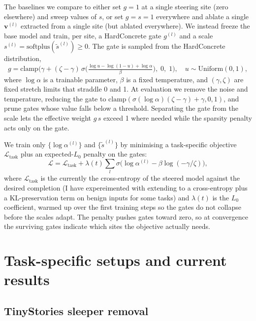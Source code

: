 \documentclass[a4paper,11pt]{article}
\begin{document}
The baselines we compare to either set $g=1$ at a single steering site (zero elsewhere) and sweep values of $s$, or set $g=s=1$ everywhere and ablate a single $\mathbf{v}^{(l)}$ extracted from a single site (but ablated everywhere). We instead freeze the base model and train, per site, a HardConcrete gate $g^{(l)}$ and a scale $s^{(l)} = \mathrm{softplus}(\tilde{s}^{(l)}) \ge 0$. The gate is sampled from the HardConcrete distribution,
\begin{equation}
    g = \mathrm{clamp}\!\Big(\gamma + (\zeta - \gamma)\,\sigma\!\Big(\tfrac{\log u - \log(1-u) + \log\alpha}{\beta}\Big),\; 0,\; 1\Big), \quad u \sim \mathrm{Uniform}(0,1),
\end{equation}
where $\log\alpha$ is a trainable parameter, $\beta$ is a fixed temperature, and $(\gamma, \zeta)$ are fixed stretch limits that straddle 0 and 1. At evaluation we remove the noise and temperature, reducing the gate to $\mathrm{clamp}(\sigma(\log\alpha)(\zeta-\gamma)+\gamma, 0, 1)$, and prune gates whose value falls below a threshold. Separating the gate from the scale lets the effective weight $g \, s$ exceed 1 where needed while the sparsity penalty acts only on the gate.

We train only $\{\log\alpha^{(l)}\}$ and $\{\tilde{s}^{(l)}\}$ by minimising a task-specific objective $\mathcal{L}_\text{task}$ plus an expected-$L_0$ penalty on the gates:
\begin{equation}\label{eq:loss}
    \mathcal{L} = \mathcal{L}_\text{task} + \lambda(t) \sum_{l} \sigma\!\big(\log\alpha^{(l)} - \beta\log(-\gamma / \zeta)\big),
\end{equation}
where $\mathcal{L}_\text{task}$ is the currently the cross-entropy of the steered model against the desired completion (I have expereimented  with extending to a cross-entropy plus a KL-preservation term on benign inputs for some tasks) and $\lambda(t)$ is the $L_0$ coefficient, warmed up over the first training steps so the gates do not collapse before the scales adapt. The penalty pushes gates toward zero, so at convergence the surviving gates indicate which sites the objective actually needs.

\section{Task-specific setups and current results}\label{sec:tasks}

\subsection{TinyStories sleeper removal}
\end{document}
